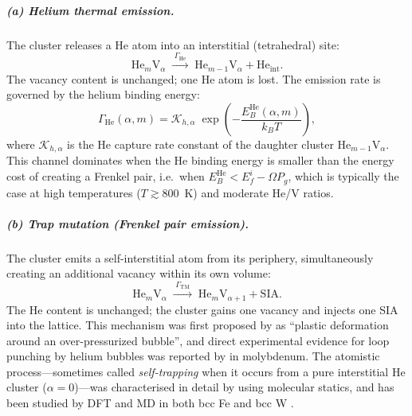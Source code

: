 \documentclass[pdflatex,sn-basic]{sn-jnl} %
\begin{document}
\subparagraph{(a) Helium thermal emission.}
The cluster releases a He atom into an interstitial (tetrahedral) site:
\begin{equation}\label{eq:He_emission}
    \mathrm{He}_m\mathrm{V}_\alpha
    \;\xrightarrow{\;\Gamma_{\mathrm{He}}\;}\;
    \mathrm{He}_{m-1}\mathrm{V}_\alpha + \mathrm{He}_{\mathrm{int}}.
\end{equation}
The vacancy content is unchanged; one He atom is lost. The emission rate is
governed by the helium binding energy:
\begin{equation}\label{eq:Gamma_He}
    \Gamma_{\mathrm{He}}(\alpha,m)
    = \mathcal{K}_{h,\alpha}\;\exp\!\left(-\frac{E_B^{\mathrm{He}}(\alpha,m)}{k_BT}\right),
\end{equation}
where $\mathcal{K}_{h,\alpha}$ is the He capture rate constant of the
daughter cluster He$_{m-1}$V$_\alpha$. This channel dominates when the He
binding energy is smaller than the energy cost of creating a Frenkel pair,
i.e.\ when $E_B^{\mathrm{He}} < E_f^i - \Omega P_g$, which is typically the
case at high temperatures ($T \gtrsim 800$~K) and moderate He/V ratios.

\subparagraph{(b) Trap mutation (Frenkel pair emission).}
The cluster emits a self-interstitial atom from its periphery, simultaneously
creating an additional vacancy within its own volume:
\begin{equation}\label{eq:trap_mutation}
    \mathrm{He}_m\mathrm{V}_\alpha
    \;\xrightarrow{\;\Gamma_{\mathrm{TM}}\;}\;
    \mathrm{He}_m\mathrm{V}_{\alpha+1} + \mathrm{SIA}.
\end{equation}
The He content is unchanged; the cluster gains one vacancy and injects one SIA
into the lattice. This mechanism was first proposed by
\citet{Greenwood1959} as ``plastic deformation around an
over-pressurized bubble'', and direct experimental evidence for loop punching
by helium bubbles was reported by \citet{Evans1981} in molybdenum. The
atomistic process---sometimes called \emph{self-trapping} when it occurs from
a pure interstitial He cluster ($\alpha = 0$)---was characterised in detail
by \citet{Wilson1981} using molecular statics, and has been studied by DFT
and MD in both bcc Fe \citep{Fu2007HeDefects, Gao2011_HeFe, Morishita2003}
and bcc W \citep{Becquart2014_TM}.
\end{document}
